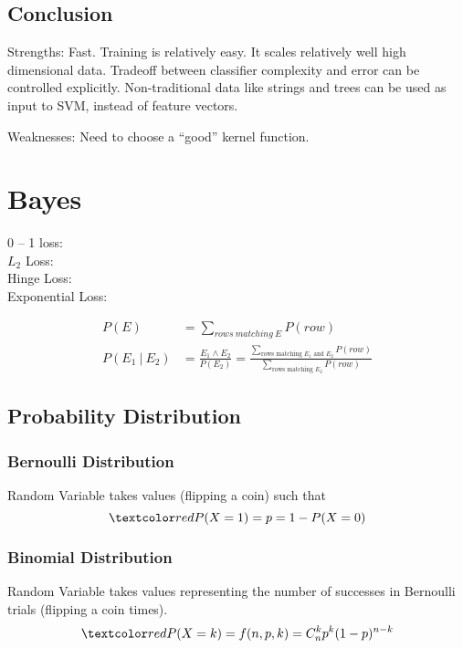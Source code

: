 \documentclass[
	exam={Midterm}
]{cs584exam}
\begin{document}
\section{Conclusion}\label{sec:conclusion}
Strengths:
Fast.
Training is relatively easy.
It scales relatively well high dimensional data.
Tradeoff between classifier complexity and error can be controlled explicitly.
Non-traditional data like strings and trees can be used as input to SVM, instead of feature vectors.

Weaknesses:
Need to choose a ``good'' kernel function.

\chapter{\Naive Bayes}\label{ch:naive-bayes}
0 -- 1 loss: \\
$L_{2}$ Loss: \\
Hinge Loss: \\
Exponential Loss: 

\begin{equation}
	\begin{aligned}
		P(E) &= \sum_{rows\ matching\ E}P(row)\\
		P(E_{1}\ |\ E_{2}) &= \frac{E_{1} \land E_{2}}{P(E_{2})} = \frac{\sum_{\mbox{rows matching } E_{1} \mbox{ and } E_{2}}P(row)}{\sum_{\mbox{rows matching } E_{2}}P(row)}
	\end{aligned}
	\label{eq:evidence-based-probability}
\end{equation}

\section{Probability Distribution}\label{sec:probability-distribution}
\subsection{Bernoulli Distribution}\label{subsec:bernoulli-distribution}
Random Variable  takes values  (flipping a coin) such that
\[ \data{ P(X=1) = p = 1 - P(X=0) } \]

\subsection{Binomial Distribution}\label{subsec:binomial-distribution}
Random Variable  takes values  representing the number of successes  in  Bernoulli trials (flipping a coin  times).
\[ \data{ P(X = k) = f(n, p, k) = C_{n}^{k}p^{k}(1 - p)^{n-k} } \]
\end{document}
